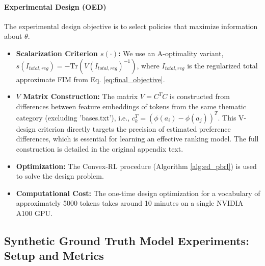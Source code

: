 \documentclass{article}
\begin{document}
\paragraph{Experimental Design (OED)}
\label{sec:appendix_exp_details_oed}
The experimental design objective is to select policies that maximize information about $\theta$.
\begin{itemize}
    \item \textbf{Scalarization Criterion $s(\cdot)$:} We use an A-optimality variant, $s(I_{total,reg}) = -\text{Tr}\left(V (I_{total,reg})^{-1}\right)$, where $I_{total,reg}$ is the regularized total approximate FIM from Eq. \ref{eq:final_objective}.
    \item \textbf{$V$ Matrix Construction:} The matrix $V=C^T C$ is constructed from differences between feature embeddings of tokens from the same thematic category (excluding 'bases.txt'), i.e., $c_k^T = (\phi(a_i) - \phi(a_j))^T$. This V-design criterion directly targets the precision of estimated preference differences, which is essential for learning an effective ranking model. The full construction is detailed in the original appendix text.
    \item \textbf{Optimization:} The Convex-RL procedure (Algorithm \ref{alg:ed_pbrl}) is used to solve the design problem.
    \item \textbf{Computational Cost:} The one-time design optimization for a vocabulary of approximately 5000 tokens takes around 10 minutes on a single NVIDIA A100 GPU.
\end{itemize}


\subsection{Synthetic Ground Truth Model Experiments: Setup and Metrics}
\label{sec:appendix_exp_details_synthetic}
\end{document}
